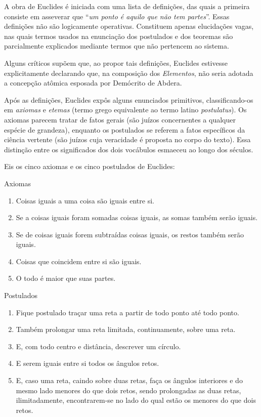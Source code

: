 \documentclass{hipatia}
\begin{document}
A obra de Euclides é iniciada com uma lista de definições, das quais a primeira consiste em asseverar que ``\emph{um ponto é aquilo que não tem partes}''. Essas definições não são logicamente operativas. Constituem apenas elucidações vagas, nas quais termos usados na enunciação dos postulados e dos teoremas são parcialmente explicados mediante termos que não pertencem ao sistema.

Alguns críticos supõem que, ao propor tais definições, Euclides estivesse explicitamente declarando que, na composição dos \emph{Elementos}, não seria adotada a concepção atômica esposada por Demócrito de Abdera. 

Após as definições, Euclides expôs alguns enunciados primitivos, classificando-os em \emph{axiomas} e \emph{etemas}  (termo grego equivalente ao termo latino \emph{postulatus}). Os axiomas parecem tratar de fatos gerais  (são juízos concernentes a qualquer espécie de grandeza), enquanto os postulados se referem a fatos específicos da ciência vertente  (são juízos cuja veracidade é proposta no corpo do texto). Essa distinção entre os significados dos dois vocábulos esmaeceu ao longo dos séculos.

Eis os %
cinco axiomas e os cinco postulados de Euclides: 

Axiomas
\begin{enumerate}
    \item 
  Coisas iguais a uma coisa são iguais entre si.
\item  Se a coisas iguais foram somadas coisas iguais, as somas também serão iguais.
\item  Se de coisas iguais forem subtraídas coisas iguais, os restos também serão iguais.
\item  Coisas que coincidem entre si são iguais. 
\item O todo é maior que suas partes.
\end{enumerate}

Postulados

\begin{enumerate}
\item    Fique postulado traçar uma reta a partir de todo ponto até todo ponto.
\item    Também prolongar uma reta limitada, continuamente, sobre uma reta.
\item    E, com todo centro e distância, descrever um círculo.
\item     E serem iguais entre si todos os ângulos retos.
\item    E, caso uma reta, caindo sobre duas retas, faça os ângulos interiores e do mesmo lado menores do que dois retos, sendo prolongadas as duas retas, ilimitadamente, encontrarem-se no lado do qual estão os menores do que dois retos.
\end{enumerate}
\end{document}
